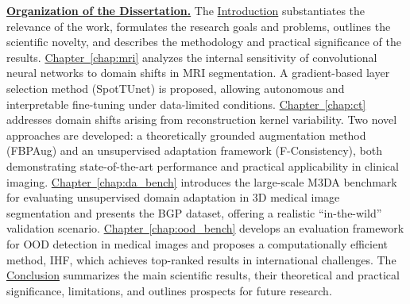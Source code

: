 \underline{\textbf{Organization of the Dissertation.}}
The \underline{Introduction} substantiates the relevance of the work, formulates the research goals and problems, outlines the scientific novelty, and describes the methodology and practical significance of the results.
\underline{Chapter~\ref{chap:mri}} analyzes the internal sensitivity of convolutional neural networks to domain shifts in MRI segmentation. A gradient-based layer selection method (SpotTUnet) is proposed, allowing autonomous and interpretable fine-tuning under data-limited conditions.
\underline{Chapter~\ref{chap:ct}} addresses domain shifts arising from reconstruction kernel variability. Two novel approaches are developed: a theoretically grounded augmentation method (FBPAug) and an unsupervised adaptation framework (F-Consistency), both demonstrating state-of-the-art performance and practical applicability in clinical imaging.
\underline{Chapter~\ref{chap:da_bench}} introduces the large-scale M3DA benchmark for evaluating unsupervised domain adaptation in 3D medical image segmentation and presents the BGP dataset, offering a realistic “in-the-wild” validation scenario.
\underline{Chapter~\ref{chap:ood_bench}}  develops an evaluation framework for OOD detection in medical images and proposes a computationally efficient method, IHF, which achieves top-ranked results in international challenges.
The \underline{Conclusion} summarizes the main scientific results, their theoretical and practical significance, limitations, and outlines prospects for future research.







